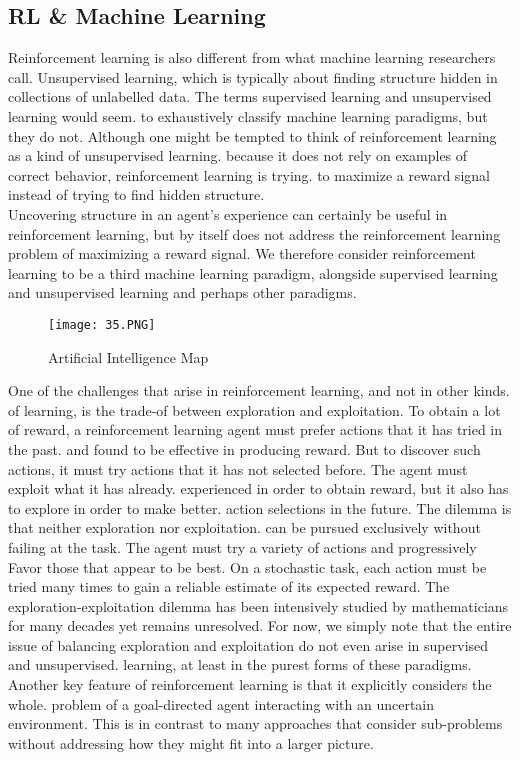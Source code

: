 \subsection{RL \& Machine Learning}
Reinforcement learning is also different from what machine learning researchers call. 
Unsupervised learning, which is typically about finding structure hidden in collections of
unlabelled data. The terms supervised learning and unsupervised learning would seem.
to exhaustively classify machine learning paradigms, but they do not. Although one
might be tempted to think of reinforcement learning as a kind of unsupervised learning.
because it does not rely on examples of correct behavior, reinforcement learning is trying.
to maximize a reward signal instead of trying to find hidden structure.\\
Uncovering structure in an agent's experience can certainly be useful in reinforcement learning,
but by itself does not address the reinforcement learning problem of maximizing a reward signal.
We therefore consider reinforcement learning to be a third machine learning paradigm,
alongside supervised learning and unsupervised learning and perhaps other paradigms. 

\begin{wrapfigure}{h}{0.4\textwidth}
    \texttt{[image: 35.PNG]}
  \caption{Artificial Intelligence Map}
\end{wrapfigure}

One of the challenges that arise in reinforcement learning, and not in other kinds.
of learning, is the trade-of between exploration and exploitation. To obtain a lot of
reward, a reinforcement learning agent must prefer actions that it has tried in the past.
and found to be effective in producing reward. But to discover such actions, it must
try actions that it has not selected before. The agent must exploit what it has already.
experienced in order to obtain reward, but it also has to explore in order to make better.
action selections in the future. The dilemma is that neither exploration nor exploitation.
can be pursued exclusively without failing at the task. The agent must try a variety of
actions and progressively Favor those that appear to be best. On a stochastic task, each
action must be tried many times to gain a reliable estimate of its expected reward. The
exploration-exploitation dilemma has been intensively studied by mathematicians for
many decades yet remains unresolved. For now, we simply note that the entire issue of
balancing exploration and exploitation do not even arise in supervised and unsupervised.
learning, at least in the purest forms of these paradigms.
Another key feature of reinforcement learning is that it explicitly considers the whole.
problem of a goal-directed agent interacting with an uncertain environment. This is in
contrast to many approaches that consider sub-problems without addressing how they
might fit into a larger picture. 

